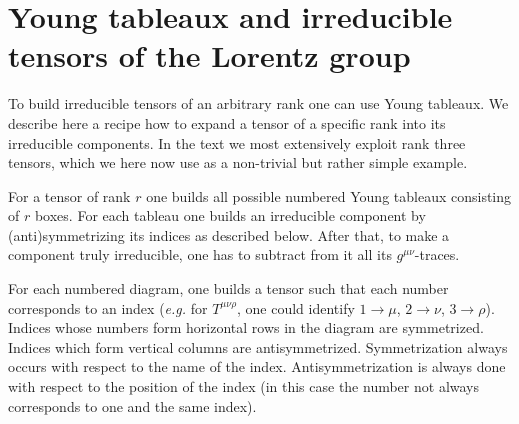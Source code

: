 \documentclass[12pt]{revtex4}
\newcommand{\md}{\mathcal{D}}
\begin{document}

\newpage
\section{Young tableaux and irreducible tensors of the Lorentz group}

	To build irreducible tensors of an arbitrary rank one can use
	Young tableaux. 
	We describe here a recipe how to expand a tensor of a specific
	rank into its irreducible components.
	In the text we most extensively exploit rank three tensors, which
	we here now use as a non-trivial but rather simple example.

	For a tensor of rank $ r $ one builds all possible numbered 
	Young tableaux consisting of $ r $ boxes.
	For each tableau one builds an irreducible component by 
	(anti)symmetrizing its indices as described below.
	After that, to make a component truly irreducible, one has to 
	subtract from it all its $ g^{\mu\nu} $-traces.

	For each numbered diagram, one builds a tensor such that
	each number corresponds to an index ({\it e.g.} 
	for $ T^{\mu\nu\rho} $, one could identify $ 1 \to \mu $,  
	$ 2 \to \nu $,  $ 3 \to \rho $).
	Indices whose numbers form horizontal rows in the diagram
	are symmetrized. 
	Indices which form vertical columns are antisymmetrized.
	Symmetrization always occurs with respect to the name
	of the index.
	Antisymmetrization is always done with respect to the
	position of the index (in this case the number not always
	corresponds to one and the same index).
\end{document}
